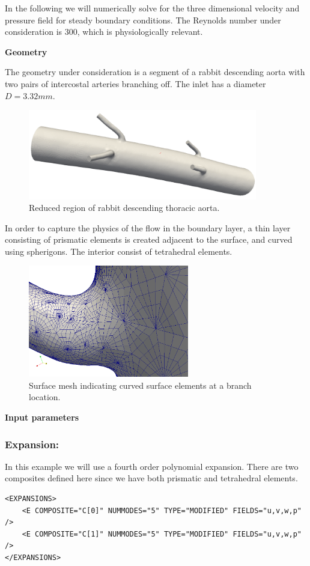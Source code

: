 In the following we will numerically solve for the three dimensional velocity
and pressure field for steady boundary conditions. The Reynolds number under
consideration is 300, which is physiologically relevant.

\textbf{Geometry}

The geometry under consideration is a segment of a rabbit descending aorta with two pairs of intercostal arteries branching off. The inlet has a diameter $D=3.32mm$.

\begin{figure}
\begin{center}
\includegraphics[width=10cm]{Figures/IntercostalGeometry.png}
\caption{Reduced region of rabbit descending thoracic aorta.}
\end{center}
\end{figure}

In order to capture the physics of the flow in the boundary layer, a thin layer consisting of prismatic elements is created adjacent to the surface, and curved using spherigons. The interior consist of tetrahedral elements.

\begin{figure}
\begin{center}
\includegraphics[width=7cm]{Figures/spherigons.png}
\caption{Surface mesh indicating curved surface elements at a branch location.}
\end{center}
\end{figure}


\textbf{Input parameters}

\subsubsection{Expansion:~} In this example we will use a fourth order polynomial expansion. There are two composites defined here since we have both prismatic and tetrahedral elements.
\begin{lstlisting}[style=XMLStyle]
<EXPANSIONS>
    <E COMPOSITE="C[0]" NUMMODES="5" TYPE="MODIFIED" FIELDS="u,v,w,p" />
    <E COMPOSITE="C[1]" NUMMODES="5" TYPE="MODIFIED" FIELDS="u,v,w,p" />
</EXPANSIONS>
\end{lstlisting}

